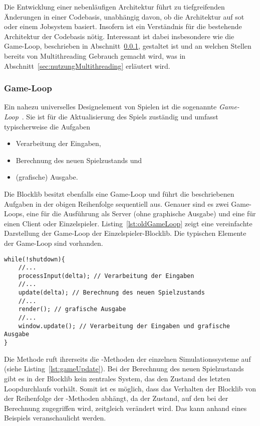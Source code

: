 Die Entwicklung einer nebenläufigen Architektur führt zu
 tiefgreifenden Änderungen in einer Codebasis, unabhängig davon, ob die Architektur auf \ac{sot} oder einem Jobsystem basiert. Insofern ist ein Verständnis für die bestehende Architektur der Codebasis nötig. Interessant ist dabei insbesondere wie die Game-Loop, beschrieben in Abschnitt~\ref{sec:gameLoop}, gestaltet ist und an welchen Stellen bereits von Multithreading Gebrauch gemacht wird, was in Abschnitt~\ref{sec:nutzungMultithreading} erläutert wird.

\subsubsection{Game-Loop}\label{sec:gameLoop}
Ein nahezu universelles Designelement von Spielen ist die sogenannte \emph{Game-Loop}~\cite[S.~161~\psqq]{Nystrom2015}. Sie ist für die Aktualisierung des Spiels zuständig und umfasst typischerweise die Aufgaben 
\begin{itemize}
  \item Verarbeitung der Eingaben,
  \item Berechnung des neuen Spielzustands und
  \item (grafische) Ausgabe.
\end{itemize}
Die Blocklib besitzt ebenfalls eine Game-Loop und führt die beschriebenen Aufgaben in der obigen Reihenfolge sequentiell aus. Genauer sind es zwei Game-Loops, eine für die Ausführung als Server (ohne graphische Ausgabe) und eine für einen Client oder Einzelspieler.
Listing~\ref{lst:oldGameLoop} zeigt eine vereinfachte Darstellung der Game-Loop der Einzelspieler-Blocklib.
Die typischen Elemente der Game-Loop sind vorhanden.

\begin{lstlisting}[caption={Vereinfachte Version der Blocklib für Einzelspieler.},label={lst:oldGameLoop},float={htbp}]
while(!shutdown){
	//...
	processInput(delta); // Verarbeitung der Eingaben
	//...
	update(delta); // Berechnung des neuen Spielzustands
	//...
	render(); // grafische Ausgabe
	//...
	window.update(); // Verarbeitung der Eingaben und grafische Ausgabe
}
\end{lstlisting}

Die Methode  ruft ihrerseits die -Methoden der einzelnen Simulationssysteme auf (siehe Listing~\ref{lst:gameUpdate}).
Bei der Berechnung des neuen Spielzustands gibt es in der Blocklib kein zentrales System, das den Zustand des letzten Loopdurchlaufs vorhält. Somit ist es möglich, dass das Verhalten der Blocklib von der Reihenfolge der -Methoden abhängt, da der Zustand, auf den bei der Berechnung zugegriffen wird, zeitgleich verändert wird. Das kann anhand eines Beispiels veranschaulicht werden. 


